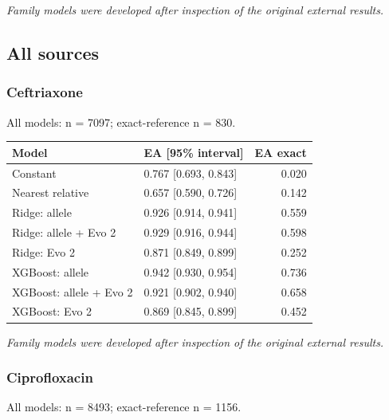 \documentclass[
  10pt,
]{article}
\newcounter{none} %
\begin{document}
\emph{Family models were developed after inspection of the original
external results.}

\subsection{All sources}\label{all-sources-1}

\subsubsection{Ceftriaxone}\label{ceftriaxone-3}

All models: n = 7097; exact-reference n = 830.

{\def\LTcaptype{none} %
\begin{longtable}[]{@{}llr@{}}
\toprule\noalign{}
Model & EA {[}95\% interval{]} & EA exact \\
\midrule\noalign{}
\endhead
\bottomrule\noalign{}
\endlastfoot
Constant & 0.767 {[}0.693, 0.843{]} & 0.020 \\
Nearest relative & 0.657 {[}0.590, 0.726{]} & 0.142 \\
Ridge: allele & 0.926 {[}0.914, 0.941{]} & 0.559 \\
Ridge: allele + Evo 2 & 0.929 {[}0.916, 0.944{]} & 0.598 \\
Ridge: Evo 2 & 0.871 {[}0.849, 0.899{]} & 0.252 \\
XGBoost: allele & 0.942 {[}0.930, 0.954{]} & 0.736 \\
XGBoost: allele + Evo 2 & 0.921 {[}0.902, 0.940{]} & 0.658 \\
XGBoost: Evo 2 & 0.869 {[}0.845, 0.899{]} & 0.452 \\
\end{longtable}
}

\emph{Family models were developed after inspection of the original
external results.}

\subsubsection{Ciprofloxacin}\label{ciprofloxacin-3}

All models: n = 8493; exact-reference n = 1156.
\end{document}
